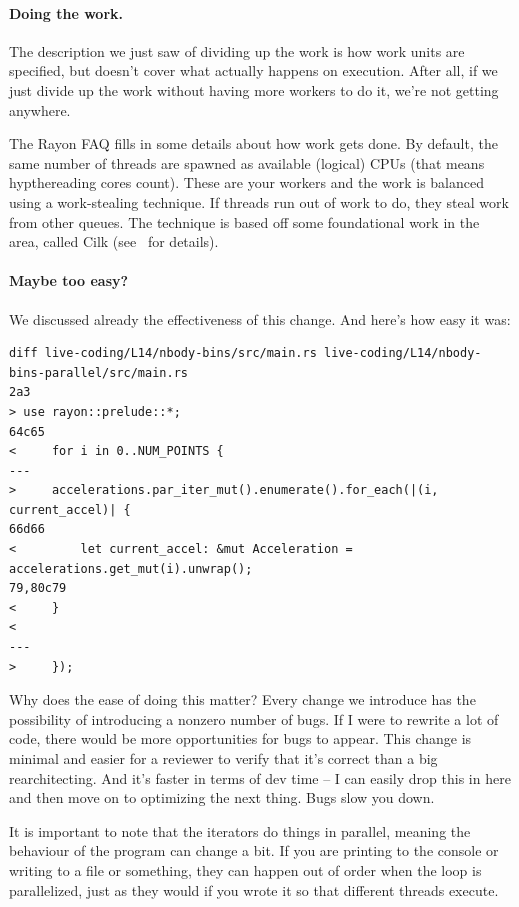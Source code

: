 \documentclass[a4paper]{report}
\begin{document}
\paragraph{Doing the work.} The description we just saw of dividing up the work is how work units are specified, but doesn't cover what actually happens on execution. After all, if we just divide up the work without having more workers to do it, we're not getting anywhere.

The Rayon FAQ fills in some details about how work gets done. By default, the same number of threads are spawned as available (logical) CPUs (that means hypthereading cores count). These are your workers and the work is balanced using a work-stealing technique. If threads run out of work to do, they steal work from other queues. The technique is based off some foundational work in the area, called Cilk (see~\cite{cilk} for details). 

\paragraph{Maybe too easy?}
We discussed already the effectiveness of this change. And here's how easy it was:

{\scriptsize 
\begin{verbatim}
diff live-coding/L14/nbody-bins/src/main.rs live-coding/L14/nbody-bins-parallel/src/main.rs
2a3
> use rayon::prelude::*;
64c65
<     for i in 0..NUM_POINTS {
---
>     accelerations.par_iter_mut().enumerate().for_each(|(i, current_accel)| {
66d66
<         let current_accel: &mut Acceleration = accelerations.get_mut(i).unwrap();
79,80c79
<     }
< 
---
>     });
\end{verbatim}
}

Why does the ease of doing this matter? Every change we introduce has the possibility of introducing a nonzero number of bugs. If I were to rewrite a lot of code, there would be more opportunities for bugs to appear. This change is minimal and easier for a reviewer to verify that it's correct than a big rearchitecting. And it's faster in terms of dev time -- I can easily drop this in here and then move on to optimizing the next thing. Bugs slow you down.

It is important to note that the iterators do things in parallel, meaning the behaviour of the program can change a bit. If you are printing to the console or writing to a file or something, they can happen out of order when the loop is parallelized, just as they would if you wrote it so that different threads execute.
\end{document}
